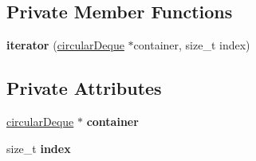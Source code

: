 \subsection*{Private Member Functions}
\begin{DoxyCompactItemize}
\item 
\hypertarget{classcircularDeque_1_1iterator_a137521582461a1f2fee4f600173ba789}{{\bfseries iterator} (\hyperlink{classcircularDeque}{circular\+Deque} $\ast$container, size\+\_\+t index)}\label{classcircularDeque_1_1iterator_a137521582461a1f2fee4f600173ba789}

\end{DoxyCompactItemize}
\subsection*{Private Attributes}
\begin{DoxyCompactItemize}
\item 
\hypertarget{classcircularDeque_1_1iterator_a6df5ff5d1f6afe89b6e7c070c07b8d1c}{\hyperlink{classcircularDeque}{circular\+Deque} $\ast$ {\bfseries container}}\label{classcircularDeque_1_1iterator_a6df5ff5d1f6afe89b6e7c070c07b8d1c}

\item 
\hypertarget{classcircularDeque_1_1iterator_a099c533da98b34ee5415675fd905dc36}{size\+\_\+t {\bfseries index}}\label{classcircularDeque_1_1iterator_a099c533da98b34ee5415675fd905dc36}

\end{DoxyCompactItemize}
